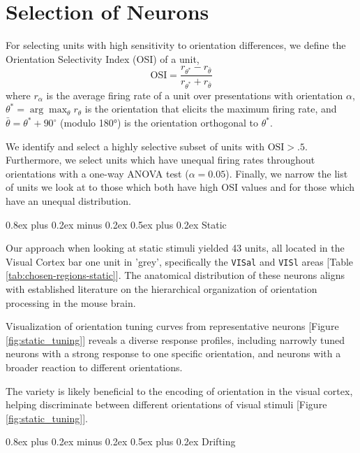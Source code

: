\documentclass[10pt,twocolumn]{article}
\makeatletter
\renewcommand{\subsection}{\@startsection{subsection}{2}{\z@}%
  {0.8ex plus 0.2ex minus 0.2ex}%
  {0.5ex plus 0.2ex}%
  {\normalfont\normalsize\bfseries}}
\makeatother
\begin{document}
\section{Selection of Neurons}

For selecting units with high sensitivity to orientation differences, we define the Orientation Selectivity Index (OSI) of a unit,
\[\textrm{OSI} = \frac{r_{\theta^*} - r_{\bar\theta}}{r_{\theta^*} + r_{\bar\theta}}\]
where $r_\alpha$ is the average firing rate of a unit over presentations with orientation $\alpha$, $\theta^* = \arg\max_\theta r_\theta$ is the orientation that elicits the maximum firing rate, and $\bar{\theta} = \theta^* + 90^\circ$ (modulo 180°) is the orientation orthogonal to $\theta^*$.

We identify and select a highly selective subset of units with \(\textrm{OSI} > .5\).  Furthermore, we select units which have unequal firing rates throughout orientations with a one-way ANOVA test (\(\alpha = 0.05\)).  Finally, we narrow the list of units we look at to those which both have high OSI values and for those which have an unequal distribution.

\subsection{Static}

Our approach when looking at static stimuli yielded 43 units, all located in the Visual Cortex bar one unit in 'grey', specifically the \texttt{VISal} and \texttt{VISl} areas [Table \ref{tab:chosen-regions-static}].  The anatomical distribution of these neurons aligns with established literature on the hierarchical organization of orientation processing in the mouse brain.

Visualization of orientation tuning curves from representative neurons [Figure \ref{fig:static_tuning}] reveals a diverse response profiles, including narrowly tuned neurons with a strong response to one specific orientation, and neurons with a broader reaction to different orientations.

The variety is likely beneficial to the encoding of orientation in the visual cortex, helping discriminate between different orientations of visual stimuli [Figure \ref{fig:static_tuning}].

\subsection{Drifting}
\end{document}
